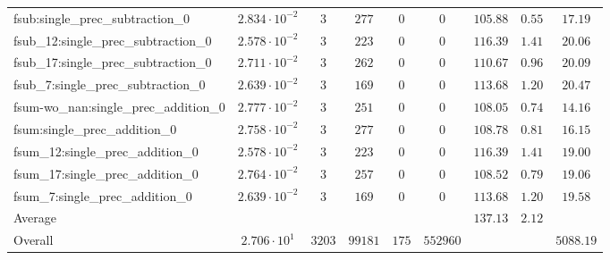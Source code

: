 \begin{tabular}{|l|c|c|c|c|c|c|c|c|}
fsub:single\_prec\_subtraction\_0              & $ 2.834 \cdot 10^{-2} $ & $ 3      $ & $ 277   $ & $ 0   $ & $ 0      $ & $ 105.88      $ & $ 0.55    $ & $ 17.19   $ \\
fsub\_12:single\_prec\_subtraction\_0          & $ 2.578 \cdot 10^{-2} $ & $ 3      $ & $ 223   $ & $ 0   $ & $ 0      $ & $ 116.39      $ & $ 1.41    $ & $ 20.06   $ \\
fsub\_17:single\_prec\_subtraction\_0          & $ 2.711 \cdot 10^{-2} $ & $ 3      $ & $ 262   $ & $ 0   $ & $ 0      $ & $ 110.67      $ & $ 0.96    $ & $ 20.09   $ \\
fsub\_7:single\_prec\_subtraction\_0           & $ 2.639 \cdot 10^{-2} $ & $ 3      $ & $ 169   $ & $ 0   $ & $ 0      $ & $ 113.68      $ & $ 1.20    $ & $ 20.47   $ \\
fsum-wo\_nan:single\_prec\_addition\_0         & $ 2.777 \cdot 10^{-2} $ & $ 3      $ & $ 251   $ & $ 0   $ & $ 0      $ & $ 108.05      $ & $ 0.74    $ & $ 14.16   $ \\
fsum:single\_prec\_addition\_0                 & $ 2.758 \cdot 10^{-2} $ & $ 3      $ & $ 277   $ & $ 0   $ & $ 0      $ & $ 108.78      $ & $ 0.81    $ & $ 16.15   $ \\
fsum\_12:single\_prec\_addition\_0             & $ 2.578 \cdot 10^{-2} $ & $ 3      $ & $ 223   $ & $ 0   $ & $ 0      $ & $ 116.39      $ & $ 1.41    $ & $ 19.00   $ \\
fsum\_17:single\_prec\_addition\_0             & $ 2.764 \cdot 10^{-2} $ & $ 3      $ & $ 257   $ & $ 0   $ & $ 0      $ & $ 108.52      $ & $ 0.79    $ & $ 19.06   $ \\
fsum\_7:single\_prec\_addition\_0              & $ 2.639 \cdot 10^{-2} $ & $ 3      $ & $ 169   $ & $ 0   $ & $ 0      $ & $ 113.68      $ & $ 1.20    $ & $ 19.58   $ \\
\hline
Average                                        & $                     $ & $        $ & $       $ & $     $ & $        $ & $ 137.13      $ & $ 2.12    $ & $         $ \\
\hline
Overall                                        & $ 2.706 \cdot 10^{1}  $ & $ 3203   $ & $ 99181 $ & $ 175 $ & $ 552960 $ & $             $ & $         $ & $ 5088.19 $ \\
\hline
\end{tabular}
